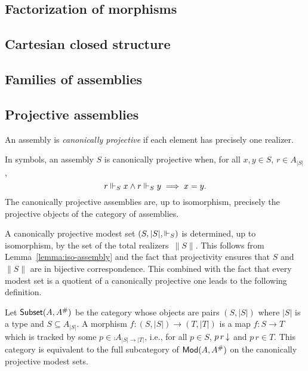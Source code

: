 
\subsection{Factorization of morphisms}
\label{sec:factorization}


\subsection{Cartesian closed structure}
\label{sec:ccc}

\subsection{Families of assemblies}
\label{sec:dependent-types}




\subsection{Projective assemblies}
\label{sec:projective-assemblies}


\begin{definition}
  An assembly is \emph{canonically projective} if each element has
  precisely one realizer.
\end{definition}

\noindent
In symbols, an assembly $S$ is canonically projective when, for all
$x, y \in S$, $r \in A_{|S|}$,
%
\begin{equation*}
  r \Vdash_S x \land r \Vdash_S y \implies x = y.
\end{equation*}
%
The canonically projective assemblies are, up to isomorphism,
precisely the projective objects of the category of assemblies.

A canonically projective modest set $(S, |S|, {\Vdash_S})$ is determined,
up to isomorphism, by the set of the total realizers~$\|S\|$. This
follows from Lemma~\ref{lemma:iso-assembly} and the fact that
projectivity ensures that $S$ and $\|S\|$ are in bijective
correspondence. This combined with the fact that every modest set is a
quotient of a canonically projective one leads to the following
definition.

Let $\mathsf{Subset}(A, A^{\#})$ be the category whose objects are pairs
$(S, |S|)$ where $|S|$ is a type and $S \subseteq A_{|S|}$. A morphism
$f : (S, |S|) \to (T, |T|)$ is a map $f : S \to T$ which is tracked by
some $p \in \comp{A}_{|S| \to |T|}$, i.e., for all $p \in S$,
$p\,r\,{\downarrow}$ and $p\,r \in T$. This category is equivalent to the
full subcategory of $\mathsf{Mod}(A, A^{\#})$ on the canonically projective
modest sets.


